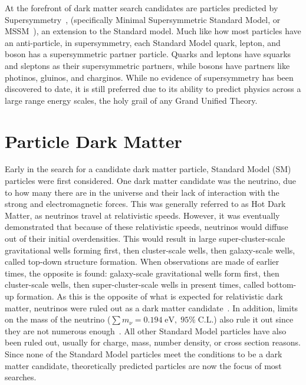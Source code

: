   At the forefront of dark matter search candidates are particles predicted by Supersymmetry~\cite{Jungman:1995df}, (specifically Minimal Supersymmetric Standard Model, or MSSM~\cite{MSSM,supersym1}), an extension to the Standard model.
  Much like how most particles have an anti-particle, in supersymmetry, each Standard Model quark, lepton, and boson has a supersymmetric partner particle.
  Quarks and leptons have squarks and sleptons as their supersymmetric partners, while bosons have partners like photinos, gluinos, and charginos.
  While no evidence of supersymmetry has been discovered to date, it is still preferred due to its ability to predict physics across a large range energy scales, the holy grail of any Grand Unified Theory.
  

\section{Particle Dark Matter}\label{sec_particledm}

  Early in the search for a candidate dark matter particle, Standard Model (SM) particles were first considered.
  One dark matter candidate was the neutrino, due to how many there are in the universe and their lack of interaction with the strong and electromagnetic forces.
  This was generally referred to as Hot Dark Matter, as neutrinos travel at relativistic speeds.
  However, it was eventually demonstrated that because of these relativistic speeds, neutrinos would diffuse out of their initial overdensities.
  This would result in large super-cluster-scale gravitational wells forming first, then cluster-scale wells, then galaxy-scale wells, called top-down structure formation.
  When observations are made of earlier times, the opposite is found: galaxy-scale gravitational wells form first, then cluster-scale wells, then super-cluster-scale wells in present times, called bottom-up formation.
  As this is the opposite of what is expected for relativistic dark matter, neutrinos were ruled out as a dark matter candidate~\cite{neutrinoHeirarchical}.
  In addition, limits on the mass of the neutrino ($\sum{}m_{\nu} = 0.194 \; \textrm{eV}, \; 95\% \; \textrm{C.L.}$) also rule it out since they are not numerous enough~\cite{planck2015}.
  All other Standard Model particles have also been ruled out, usually for charge, mass, number density, or cross section reasons.
  Since none of the Standard Model particles meet the conditions to be a dark matter candidate, theoretically predicted particles are now the focus of most searches.
  
